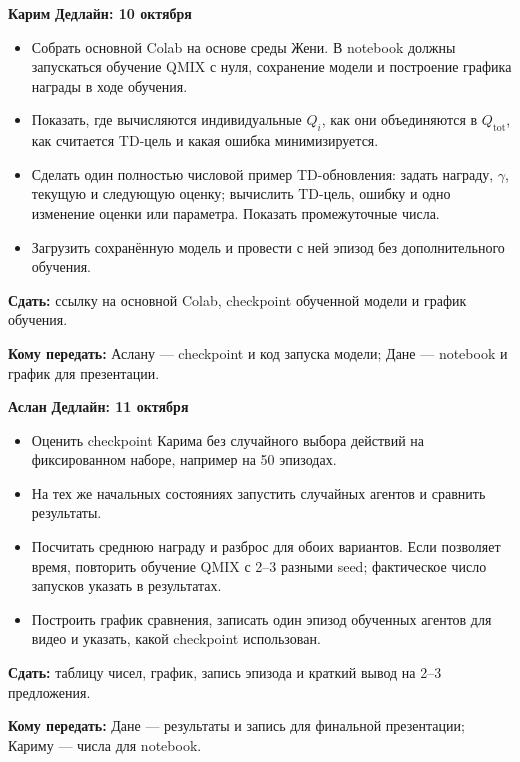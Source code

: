 \documentclass[11pt,a4paper]{article}
\newcommand{\person}[2]{%
  \Needspace{12\baselineskip}
  \vspace{5pt}
  \noindent\colorbox{pale}{\parbox{\dimexpr\linewidth-2\fboxsep\relax}{%
    \hspace*{7pt}\rule{0pt}{25pt}{\Large\bfseries\color{navy}#1}%
    \hfill{\bfseries\color{deadline}Дедлайн: #2}\hspace*{7pt}}}\par
  \vspace{1pt}
}
\begin{document}
\person{Карим}{10 октября}
\begin{itemize}
  \item Собрать основной Colab на основе среды Жени. В notebook должны запускаться обучение QMIX с нуля, сохранение модели и построение графика награды в ходе обучения.
  \item Показать, где вычисляются индивидуальные $Q_i$, как они объединяются в $Q_{\mathrm{tot}}$, как считается TD-цель и какая ошибка минимизируется.
  \item Сделать один полностью числовой пример TD-обновления: задать награду, $\gamma$, текущую и следующую оценку; вычислить TD-цель, ошибку и одно изменение оценки или параметра. Показать промежуточные числа.
  \item Загрузить сохранённую модель и провести с ней эпизод без дополнительного обучения.
\end{itemize}
\textbf{Сдать:} ссылку на основной Colab, checkpoint обученной модели и график обучения.\par
\textbf{Кому передать:} Аслану — checkpoint и код запуска модели; Дане — notebook и график для презентации.\par

\person{Аслан}{11 октября}
\begin{itemize}
  \item Оценить checkpoint Карима без случайного выбора действий на фиксированном наборе, например на 50 эпизодах.
  \item На тех же начальных состояниях запустить случайных агентов и сравнить результаты.
  \item Посчитать среднюю награду и разброс для обоих вариантов. Если позволяет время, повторить обучение QMIX с 2--3 разными seed; фактическое число запусков указать в результатах.
  \item Построить график сравнения, записать один эпизод обученных агентов для видео и указать, какой checkpoint использован.
\end{itemize}
\textbf{Сдать:} таблицу чисел, график, запись эпизода и краткий вывод на 2--3 предложения.\par
\textbf{Кому передать:} Дане — результаты и запись для финальной презентации; Кариму — числа для notebook.\par
\end{document}
